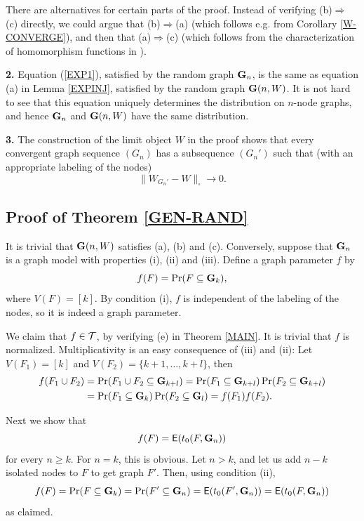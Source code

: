 \documentclass[fleqn]{article}
\begin{document}
\medskip

 There are alternatives for certain parts
of the proof. Instead of verifying (b)$\Rightarrow$(c) directly, we
could argue that (b)$\Rightarrow$(a) (which follows e.g. from
Corollary \ref{W-CONVERGE}), and then that (a)$\Rightarrow$(c) (which
follows from the characterization of homomorphism functions in
\cite{FLS}).

\medskip

{\bf 2.} Equation (\ref{EXP1}), satisfied by the random graph
${\mathbf G}_n$, is the same as equation (a) in Lemma \ref{EXPINJ}, satisfied
by the random graph ${\mathbf G}(n,W)$. It is not hard to see that this
equation uniquely determines the distribution on $n$-node graphs, and
hence ${\mathbf G}_n$ and ${\mathbf G}(n,W)$ have the same distribution.

\medskip

{\bf 3.} The construction of the limit object $W$ in the proof shows
that every convergent graph sequence $(G_n)$ has a subsequence
$(G_n')$ such that (with an appropriate labeling of the nodes)
\[
\|W_{G_n'}-W\|_\square \to 0.
\]

\subsection{Proof of Theorem \ref{GEN-RAND}}

It is trivial that ${\mathbf G}(n,W)$ satisfies (a), (b) and (c). Conversely,
suppose that ${\mathbf G}_n$ is a graph model with properties (i), (ii) and
(iii). Define a graph parameter $f$ by
\[
f(F)=\Pr(F\subseteq {\mathbf G}_k),
\]
where $V(F)=[k]$. By condition (i), $f$ is independent of the
labeling of the nodes, so it is indeed a graph parameter.

We claim that $f\in{\cal T}$, by verifying (e) in Theorem \ref{MAIN}. It
is trivial that $f$ is normalized. Multiplicativity is an easy
consequence of (iii) and (ii): Let $V(F_1)=[k]$ and
$V(F_2)=\{k+1,\dots,k+l\}$, then
\begin{align*}
f(F_1\cup F_2)&=\Pr(F_1\cup F_2\subseteq
{\mathbf G}_{k+l})=\Pr(F_1\subseteq {\mathbf G}_{k+l})\Pr(F_2\subseteq
{\mathbf G}_{k+l})\\&=\Pr(F_1\subseteq {\mathbf G}_{k})\Pr(F_2\subseteq
{\mathbf G}_{l})=f(F_1)f(F_2).
\end{align*}

Next we show that
\begin{equation}\label{FETG}
f(F)={\sf E}(t_0(F,{\mathbf G}_n))
\end{equation}
for every $n\ge k$. For $n=k$, this is obvious. Let $n>k$, and let us
add $n-k$ isolated nodes to $F$ to get graph $F'$. Then, using
condition (ii),
\[
f(F)=\Pr(F\subseteq {\mathbf G}_k)=\Pr(F'\subseteq
{\mathbf G}_n)={\sf E}(t_0(F',{\mathbf G}_n))={\sf E}(t_0(F,{\mathbf G}_n))
\]
as claimed.
\end{document}
